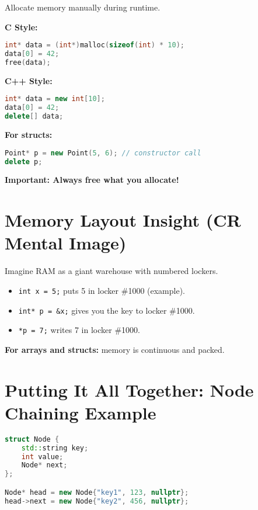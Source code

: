 \documentclass{article}
\begin{document}
Allocate memory manually during runtime.

\vspace{0.5em}
\textbf{C Style:}

\begin{lstlisting}[language=C]
int* data = (int*)malloc(sizeof(int) * 10);
data[0] = 42;
free(data);
\end{lstlisting}

\vspace{0.5em}
\textbf{C++ Style:}

\begin{lstlisting}[language=C++]
int* data = new int[10];
data[0] = 42;
delete[] data;
\end{lstlisting}

\textbf{For structs:}

\begin{lstlisting}[language=C++]
Point* p = new Point(5, 6); // constructor call
delete p;
\end{lstlisting}

\textbf{Important: Always free what you allocate!}

\section*{Memory Layout Insight (CR Mental Image)}

Imagine RAM as a giant warehouse with numbered lockers.

\begin{itemize}
    \item \texttt{int x = 5;} puts 5 in locker \#1000 (example).
    \item \texttt{int* p = \&x;} gives you the key to locker \#1000.
    \item \texttt{*p = 7;} writes 7 in locker \#1000.
\end{itemize}

\textbf{For arrays and structs:} memory is continuous and packed.

\section*{Putting It All Together: Node Chaining Example}

\begin{lstlisting}[language=C++]
struct Node {
    std::string key;
    int value;
    Node* next;
};

Node* head = new Node{"key1", 123, nullptr};
head->next = new Node{"key2", 456, nullptr};
\end{lstlisting}
\end{document}
